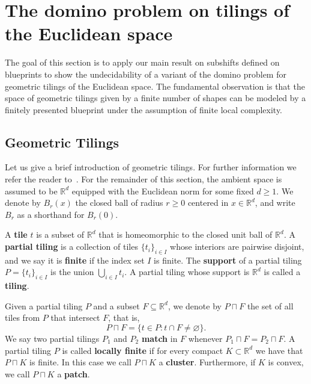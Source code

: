 \documentclass{article}
\theoremstyle{definition}
\theoremstyle{definition}
\newcommand{\R}{\mathbb{R}}
\newcommand{\define}[1]{\textbf{#1}}
\newcommand{\todo}[1]{\textcolor{red}{\textnormal{TODO: #1}}}
\begin{document}



%
\section{The domino problem on tilings of the Euclidean space}
\label{sec:geometric}

The goal of this section is to apply our main result on subshifts defined on blueprints to show the undecidability of a variant of the domino problem for geometric tilings of the Euclidean space. The fundamental observation is that the space of geometric tilings given by a finite number of shapes can be modeled by a finitely presented blueprint under the assumption of finite local complexity.

\subsection{Geometric Tilings}

Let us give a brief introduction of geometric tilings. For further information we refer the reader to~\cite{Baake_Grimm_2013,Baake_Grimm_2017,Lagarias1999}. For the remainder of this section, the ambient space is assumed to be $\R^d$ equipped with the Euclidean norm for some fixed $d \geq 1$. We denote by $B_r(x)$ the closed ball of radius $r \geq 0$ centered in $x\in \R^d$, and write $B_r$ as a shorthand for $B_r(0)$.

A \define{tile} $t$ is a subset of $\R^d$ that is homeomorphic to the closed unit ball of $\R^d$. A \define{partial tiling} is a collection of tiles $\{t_i\}_{i\in I}$ whose interiors are pairwise disjoint, and we say it is \define{finite} if the index set $I$ is finite. The \define{support} of a partial tiling $P = \{t_i\}_{i\in I}$ is the union $\bigcup_{i \in I}t_i$. A partial tiling whose support is $\R^d$ is called a \define{tiling}. 


Given a partial tiling $P$ and a subset $F\subseteq\R^d$, we denote by $P \sqcap F$ the set of all tiles from $P$ that intersect $F$, that is, \[P\sqcap F = \{ t\in P : t\cap F\neq\varnothing\}.\] We say two partial tilings $P_1$ and $P_2$ \define{match} in $F$ whenever $P_1\sqcap F = P_2 \sqcap F$. A partial tiling $P$ is called \define{locally finite} if for every compact $K\subset \R^d$ we have that $P \sqcap K$ is finite. In this case we call $P \sqcap K$ a \define{cluster}. Furthermore, if $K$ is convex, we call $P \sqcap K$ a \define{patch}.
\end{document}
